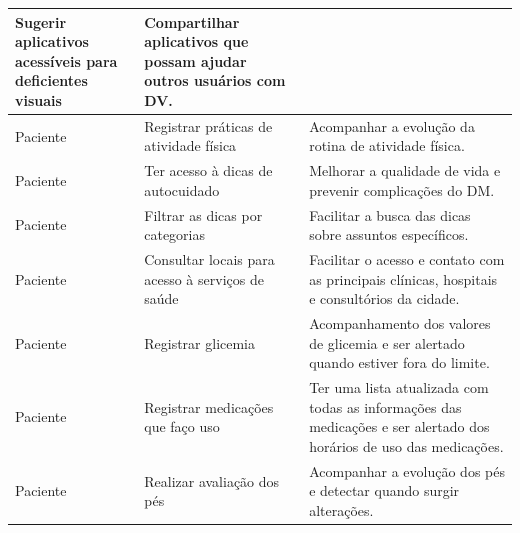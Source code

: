 \begin{table}[htb]
\begin{center}
\begin{tabular}{p{2.0cm}|p{5.0cm}|p{7.0cm}}
            Sugerir aplicativos acessíveis para deficientes visuais        &
            Compartilhar aplicativos que possam ajudar outros usuários com DV\@.                                                \\
            \hline
            Paciente                                                       &
            Registrar práticas de atividade física                         &
            Acompanhar a evolução da rotina de atividade física.                                                                \\
            \hline
            Paciente                                                       &
            Ter acesso à dicas de autocuidado                              &
            Melhorar a qualidade de vida e prevenir complicações do DM\@.                                                       \\
            \hline
            Paciente                                                       &
            Filtrar as dicas por categorias                                &
            Facilitar a busca das dicas sobre assuntos específicos.                                                             \\
            \hline
            Paciente                                                       &
            Consultar locais para acesso à serviços de saúde               &
            Facilitar o acesso e contato com as principais clínicas, hospitais e consultórios da cidade.                        \\
            \hline
            Paciente                                                       &
            Registrar glicemia                                             &
            Acompanhamento dos valores de glicemia e ser alertado quando estiver fora do limite.                                \\
            \hline
            Paciente                                                       &
            Registrar medicações que faço uso                              &
            Ter uma lista atualizada com todas as informações das medicações e ser alertado dos horários de uso das medicações. \\
            \hline
            Paciente                                                       &
            Realizar avaliação dos pés                                     &
            Acompanhar a evolução dos pés e detectar quando surgir alterações.                                                  \\

\end{tabular}
\end{center}
\end{table}
